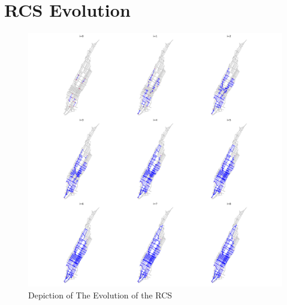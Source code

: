 \section{RCS Evolution}
\begin{figure}[h]
	\centering
	\includegraphics[width=\textwidth]{assets/img/appendix_d/evolution_nyc_plot.png}
	\caption{Depiction of The Evolution of the RCS}
	\label{app:fig:nyc_evolution}
\end{figure}